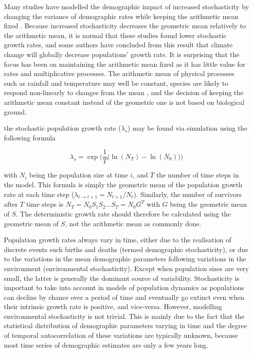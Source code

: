 \documentclass[preprint,authoryear,12pt]{elsarticle}
\begin{document}
Many studies have modelled the demographic impact of increased
stochasticity by changing the variance of demographic rates while
keeping the arithmetic mean fixed
\citep[e.g.,][]{frederiksen_demographic_2008,schmutz_stochastic_2009,samaranayaka_modelling_2010}.
Because increased stochasticity decreases the geometric mean
relatively to the arithmetic mean, it is normal that these studies
found lower stochastic growth rates, and some authors have concluded
from this result that climate change will globally decrease
populations' growth rate. It is surprising that the focus has been on
maintaining the arithmetic mean fixed as it has little value for rates
and multiplicative processes. The arithmetic mean of physical
processes such as rainfall and temperature may well be constant,
species are likely to respond non-linearly to changes from the mean
\citep{drake_population_2005}, and the decision of keeping the
arithmetic mean constant instead of the geometric one is not based on
biological ground.

the stochastic population
growth rate ($\lambda_{s}$) may be found via simulation using the
following formula \citep{caswell_matrix_2001}

\[
\lambda_{s} = \exp \Big( \frac{1}{T} \big( \ln(N_{T}) -
  \ln(N_{0}) \big) \Big)
\]

with $N_{i}$ being the population size at time $i$, and $T$ the number
of time steps in the model. This formula is simply the geometric mean
of the population growth rate at each time step ($\lambda_{t \to t+1}
= N_{t+1}/N_{t}$). Similarly, the number of survivors after $T$ time
steps is $N_{T} = N_{0} S_{1} S_{2} ... S_{T} = N_{0} G^T$ with $G$
being the geometric mean of $S$. The deterministic growth rate should
therefore be calculated using the geometric mean of $S$, not the
arithmetic mean as commonly done.




Population growth rates always vary in time, either due to the
realisation of discrete events such births and deaths (termed
demographic stochasticity), or due to the variations in the mean
demographic parameters following variations in the environment
(environmental stochasticity). Except when population sizes are very
small, the latter is generally the dominant source of
variability. Stochasticity is important to take into account in models
of population dynamics as populations can decline by chance over a
period of time and eventually go extinct even when their intrinsic
growth rate is positive, and vice-versa. However, modelling
environmental stochasticity is not trivial. This is mainly due to the
fact that the statistical distribution of demographic parameters
varying in time and the degree of temporal autocorrelation of these
variations are typically unknown, because most time series of
demographic estimates are only a few years long.
\end{document}
